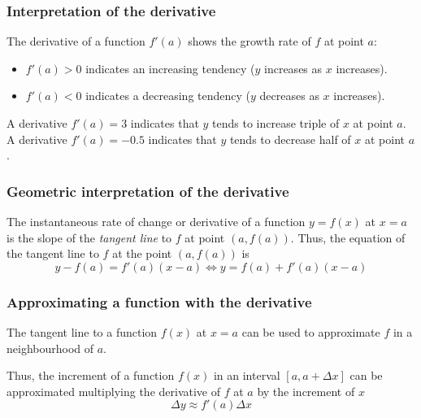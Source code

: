 \begin{frame}
\frametitle{Interpretation of the derivative}
The derivative of a function $f'(a)$ shows the growth rate of $f$ at point $a$:
\begin{itemize}
\item $f'(a)>0$ indicates an increasing tendency ($y$ increases as $x$ increases).
\item $f'(a)<0$ indicates a decreasing tendency ($y$ decreases as $x$ increases).
\end{itemize}

 A derivative $f'(a)=3$ indicates that $y$ tends to increase triple of $x$ at point $a$. 
 A derivative $f'(a)=-0.5$ indicates that $y$ tends to decrease half of $x$ at point $a$. 
\end{frame}


\begin{frame}
\frametitle{Geometric interpretation of the derivative}

The instantaneous rate of change or derivative of a function $y=f(x)$ at $x=a$ is the slope of the \emph{tangent line} to $f$ at point $(a,f(a))$. 
Thus, the equation of the tangent line to $f$ at the point $(a,f(a))$ is
\[
y-f(a) = f'(a)(x-a) \Leftrightarrow y = f(a)+f'(a)(x-a)
\]
\begin{center}

\end{center}
\end{frame}


\begin{frame}
\frametitle{Approximating a function with the derivative}
The tangent line to a function $f(x)$ at $x=a$ can be used to approximate $f$ in a neighbourhood of $a$.
\begin{center}

\end{center}
Thus, the increment of a function $f(x)$ in an interval $[a,a+\Delta x]$ can be approximated multiplying the derivative of $f$ at $a$ by the increment of $x$
\[
\Delta y \approx f'(a)\Delta x
\]
\end{frame}


